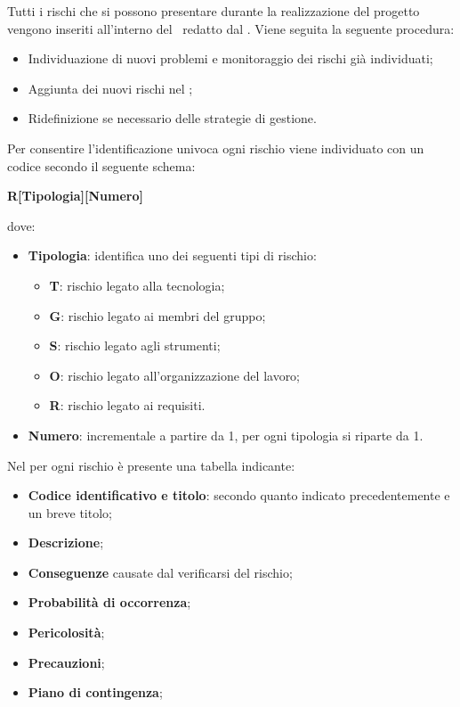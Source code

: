 \label{GestioneRischi}
Tutti i rischi che si possono presentare durante la realizzazione del progetto vengono inseriti all'interno del \PdPv\ redatto dal \Responsabile.
Viene seguita la seguente procedura:
\begin{itemize}
	\item Individuazione di nuovi problemi e monitoraggio dei rischi già individuati;
	\item Aggiunta dei nuovi rischi nel \PdPv;
	\item Ridefinizione se necessario delle strategie di gestione.
\end{itemize}
Per consentire l'identificazione univoca ogni rischio viene individuato con un codice secondo il seguente schema:
\begin{center}
	\textbf{R[Tipologia][Numero]}
\end{center}
dove: 
\begin{itemize}
	\item \textbf{Tipologia}: identifica uno dei seguenti tipi di rischio:
		\begin{itemize}
			\item \textbf{T}: rischio legato alla tecnologia;
			\item \textbf{G}: rischio legato ai membri del gruppo;
			\item \textbf{S}: rischio legato agli strumenti;
			\item \textbf{O}: rischio legato all'organizzazione del lavoro;
			\item \textbf{R}: rischio legato ai requisiti.
		\end{itemize}
	\item \textbf{Numero}: incrementale a partire da 1, per ogni tipologia si riparte da 1.
\end{itemize}
Nel \PdPv  per ogni rischio è presente una tabella indicante:
\begin{itemize}
	\item \textbf{Codice identificativo e titolo}: secondo quanto indicato precedentemente e un breve titolo;
	\item \textbf{Descrizione};
	\item \textbf{Conseguenze} causate dal verificarsi del rischio;
	\item \textbf{Probabilità di occorrenza};
	\item \textbf{Pericolosità};
	\item \textbf{Precauzioni};
	\item \textbf{Piano di contingenza};
\end{itemize}

